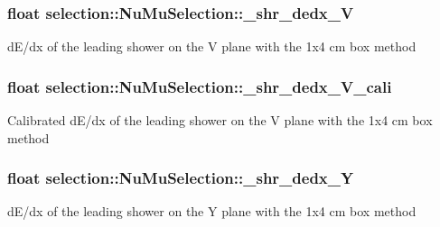 \subsubsection[{\texorpdfstring{\+\_\+shr\+\_\+dedx\+\_\+V}{_shr_dedx_V}}]{\setlength{\rightskip}{0pt plus 5cm}float selection\+::\+Nu\+Mu\+Selection\+::\+\_\+shr\+\_\+dedx\+\_\+V\hspace{0.3cm}{\ttfamily [private]}}\hypertarget{classselection_1_1NuMuSelection_a779a5d2a981609620e58ecb9cc476757}{}\label{classselection_1_1NuMuSelection_a779a5d2a981609620e58ecb9cc476757}
d\+E/dx of the leading shower on the V plane with the 1x4 cm box method 
\subsubsection[{\texorpdfstring{\+\_\+shr\+\_\+dedx\+\_\+\+V\+\_\+cali}{_shr_dedx_V_cali}}]{\setlength{\rightskip}{0pt plus 5cm}float selection\+::\+Nu\+Mu\+Selection\+::\+\_\+shr\+\_\+dedx\+\_\+\+V\+\_\+cali\hspace{0.3cm}{\ttfamily [private]}}\hypertarget{classselection_1_1NuMuSelection_a74fb79b425a2a1fc35ac9050df2e28e0}{}\label{classselection_1_1NuMuSelection_a74fb79b425a2a1fc35ac9050df2e28e0}
Calibrated d\+E/dx of the leading shower on the V plane with the 1x4 cm box method 
\subsubsection[{\texorpdfstring{\+\_\+shr\+\_\+dedx\+\_\+Y}{_shr_dedx_Y}}]{\setlength{\rightskip}{0pt plus 5cm}float selection\+::\+Nu\+Mu\+Selection\+::\+\_\+shr\+\_\+dedx\+\_\+Y\hspace{0.3cm}{\ttfamily [private]}}\hypertarget{classselection_1_1NuMuSelection_a94dda0e5c78c02e5787f00ded787f7ab}{}\label{classselection_1_1NuMuSelection_a94dda0e5c78c02e5787f00ded787f7ab}
d\+E/dx of the leading shower on the Y plane with the 1x4 cm box method 
